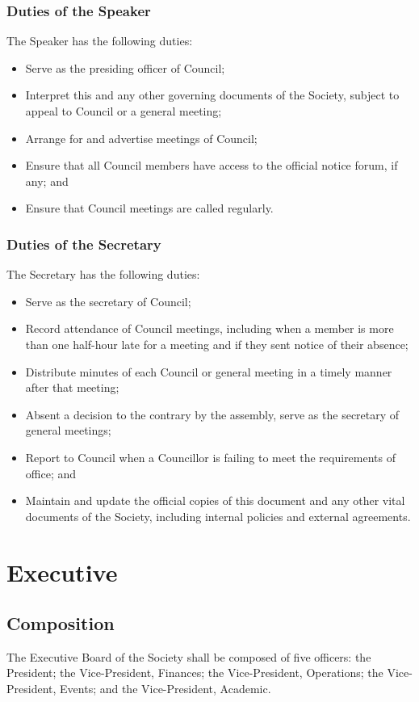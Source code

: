 \subsubsection{Duties of the Speaker}
The Speaker has the following duties:
\begin{itemize}
  \item Serve as the presiding officer of Council;
  \item Interpret this and any other governing documents of the Society, subject
    to appeal to Council or a general meeting;
  \item Arrange for and advertise meetings of Council;
  \item Ensure that all Council members have access to the official notice
    forum, if any; and
  \item Ensure that Council meetings are called regularly.
\end{itemize}

\subsubsection{Duties of the Secretary}
The Secretary has the following duties:
\begin{itemize}
  \item Serve as the secretary of Council;
  \item Record attendance of Council meetings, including when a member is more
    than one half-hour late for a meeting and if they sent notice of their
    absence;
  \item Distribute minutes of each Council or general meeting in a timely manner
    after that meeting;
  \item Absent a decision to the contrary by the assembly, serve as the
    secretary of general meetings;
  \item Report to Council when a Councillor is failing to meet the requirements
    of office; and
  \item Maintain and update the official copies of this document and any other
    vital documents of the Society, including internal policies and external
    agreements.
\end{itemize}

\section{Executive}
\subsection{Composition}
The Executive Board of the Society shall be composed of five officers: the
President; the Vice-President, Finances; the Vice-President, Operations; the
Vice-President, Events; and the Vice-President, Academic.

